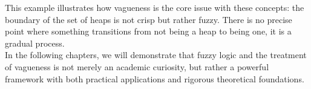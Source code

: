 This example illustrates how vagueness is the core issue with these concepts: the boundary of the set of heaps is not crisp but rather fuzzy. There is no precise point where something transitions from not being a heap to being one, it is a gradual process. \\

In the following chapters, we will demonstrate that fuzzy logic and the treatment of vagueness is not merely an academic curiosity, but rather a powerful framework with both practical applications and rigorous theoretical foundations.
